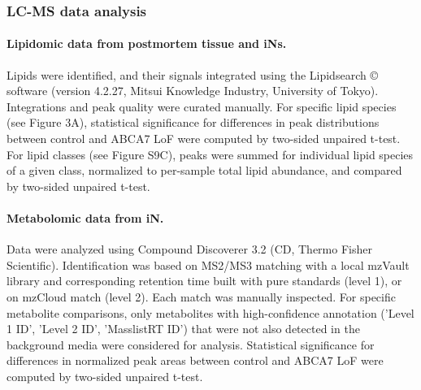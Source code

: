 \subsubsection{LC-MS data analysis} 

\paragraph{Lipidomic data from postmortem tissue and iNs.}
Lipids were identified, and their signals integrated using the Lipidsearch © software (version 4.2.27, Mitsui Knowledge Industry, University of Tokyo). Integrations and peak quality were curated manually. For specific lipid species (see Figure 3A), statistical significance for differences in peak distributions between control and ABCA7 LoF were computed by two-sided unpaired t-test. For lipid classes (see Figure S9C), peaks were summed for individual lipid species of a given class, normalized to per-sample total lipid abundance, and compared by two-sided unpaired t-test.

\paragraph{Metabolomic data from iN.}
Data were analyzed using Compound Discoverer 3.2 (CD, Thermo Fisher Scientific). Identification was based on MS2/MS3 matching with a local mzVault library and corresponding retention time built with pure standards (level 1), or on mzCloud match (level 2). Each match was manually inspected. For specific metabolite comparisons, only metabolites with high-confidence annotation ('Level 1 ID', 'Level 2 ID', 'MasslistRT ID') that were not also detected in the background media were considered for analysis. Statistical significance for differences in normalized peak areas between control and ABCA7 LoF were computed by two-sided unpaired t-test.

